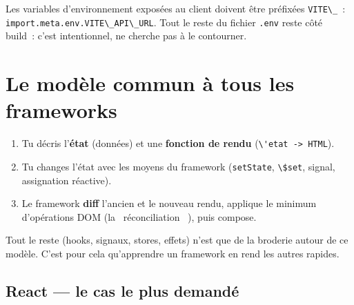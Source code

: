 Les variables d'environnement expos\'ees au client doivent \^etre pr\'efix\'ees \verb|VITE\_|~:
\verb|import.meta.env.VITE\_API\_URL|. Tout le reste du fichier \verb|.env| reste c\^ot\'e build~:
c'est intentionnel, ne cherche pas \`a le contourner.

\section{Le mod\`ele commun \`a tous les frameworks}

\begin{enumerate}
  \item Tu d\'ecris l'\textbf{\'etat} (donn\'ees) et une \textbf{fonction de rendu}
        (\verb|\'etat -> HTML|).
  \item Tu changes l'\'etat avec les moyens du framework (\verb|setState|, \verb|\$set|, signal,
        assignation r\'eactive).
  \item Le framework \textbf{diff} l'ancien et le nouveau rendu, applique le minimum
        d'op\'erations DOM (la \og ~r\'econciliation~ \fg{}), puis compose.
\end{enumerate}

Tout le reste (hooks, signaux, stores, effets) n'est que de la broderie autour de ce mod\`ele.
C'est pour cela qu'apprendre un framework en rend les autres rapides.

\subsection{React --- le cas le plus demand\'e}

